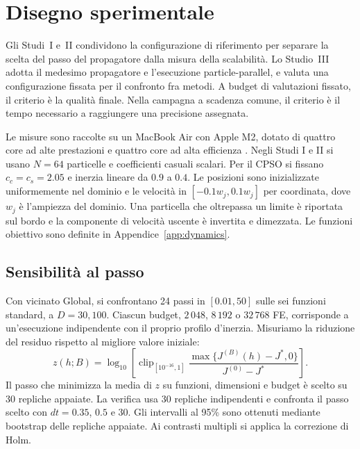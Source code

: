 \section{Disegno sperimentale}\label{sec:exp}

Gli Studi~I e~II condividono la configurazione di riferimento per separare la scelta del passo del propagatore dalla misura della scalabilità. Lo Studio~III adotta il medesimo propagatore e l'esecuzione particle-parallel, e valuta una configurazione fissata per il confronto fra metodi. A budget di valutazioni fissato, il criterio è la qualità finale. Nella campagna a scadenza comune, il criterio è il tempo necessario a raggiungere una precisione assegnata.

Le misure sono raccolte su un MacBook Air con Apple M2, dotato di quattro core ad alte prestazioni e quattro core ad alta efficienza \citep{AppleM2Specs,AppleM2Design}. Negli Studi I e II si usano $N=64$ particelle e coefficienti casuali scalari. Per il CPSO si fissano $c_c=c_s=2.05$ e inerzia lineare da $0.9$ a $0.4$. Le posizioni sono inizializzate uniformemente nel dominio e le velocità in $[-0.1w_j,0.1w_j]$ per coordinata, dove $w_j$ è l'ampiezza del dominio. Una particella che oltrepassa un limite è riportata sul bordo e la componente di velocità uscente è invertita e dimezzata. Le funzioni obiettivo sono definite in Appendice~\ref{app:dynamics}.

\subsection{Sensibilità al passo}\label{subsec:exp-dt}
Con vicinato Global, si confrontano 24 passi in $[0.01,50]$ sulle sei funzioni standard, a $D=30,100$. Ciascun budget, $2\,048$, $8\,192$ o $32\,768$ FE, corrisponde a un'esecuzione indipendente con il proprio profilo d'inerzia. Misuriamo la riduzione del residuo rispetto al migliore valore iniziale:
\begin{equation}
 z(h;B)=\log_{10}\!\left[\operatorname{clip}_{[10^{-16},1]}
 \frac{\max\{J^{(B)}(h)-J^*,0\}}{J^{(0)}-J^*}\right].
 \label{eq:dt-criterion}
\end{equation}
Il passo che minimizza la media di $z$ su funzioni, dimensioni e budget è scelto su 30 repliche appaiate. La verifica usa 30 repliche indipendenti e confronta il passo scelto con $dt=0.35$, $0.5$ e $30$. Gli intervalli al 95\% sono ottenuti mediante bootstrap delle repliche appaiate. Ai contrasti multipli si applica la correzione di Holm.


